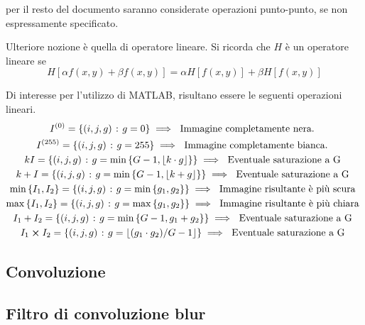 \documentclass{subfiles}
\begin{document}
\begin{Note*}
    per il resto del documento saranno considerate operazioni punto-punto, se non espressamente specificato.
\end{Note*}

\noindent Ulteriore nozione è quella di operatore lineare. Si ricorda che \(H\) è un operatore lineare se
\begin{equation}
    H[\alpha f(x,y) + \beta f(x,y)] = \alpha H[f(x,y)] + \beta H[f(x, y)]
\end{equation}

Di interesse per l'utilizzo di MATLAB, risultano essere le seguenti operazioni lineari.
\[\begin{gathered}
        I^{(0)} = \set{(i,j,g)}{g = 0} \implies \text{Immagine completamente nera.} \\
        I^{(255)} = \set{(i,j,g)}{g = 255} \implies \text{Immagine completamente bianca.} \\
        kI = \set{(i,j,g)}{g = \min{G - 1, \floor{k \cdot g}}} \implies \text{Eventuale saturazione a G} \\
        k + I = \set{(i,j,g)}{g = \min{G - 1, \floor{k + g}}} \implies \text{Eventuale saturazione a G} \\
        \min{I_{1}, I_{2}} = \set{(i,j,g)}{g = \min{g_{1}, g_{2}}} \implies \text{Immagine risultante è più scura} \\
        \max{I_{1}, I_{2}} = \set{(i,j,g)}{g = \max{g_{1}, g_{2}}} \implies \text{Immagine risultante è più chiara} \\
        I_{1} + I_{2} = \set{(i,j,g)}{g = \min{G - 1, g_{1} + g_{2}}} \implies \text{Eventuale saturazione a G} \\
        I_{1} \cp I_{2} = \set{(i,j,g)}{g = \floor{(g_{1} \cdot g_{2})/G - 1}} \implies \text{Eventuale saturazione a G} \\
    \end{gathered}\]
\clearpage

\subsection{Convoluzione}


\subsection{Filtro di convoluzione blur}

\clearpage
\end{document}
